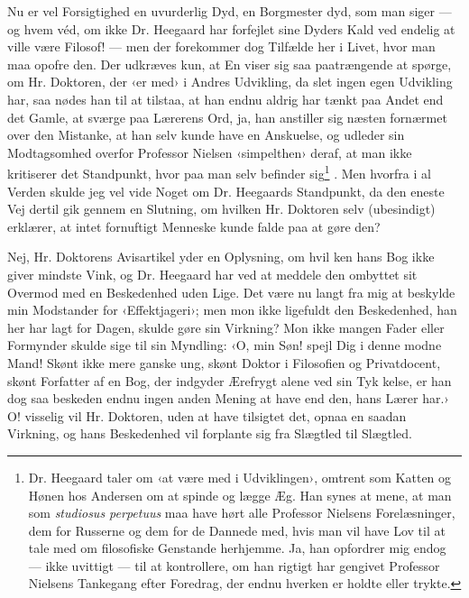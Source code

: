 \documentclass[12pt,a4paper,openany]{book}
\renewcommand{\thefootnote}{*)}
\newcommand{\fnmark}[2]{\renewcommand{\thefootnote}{#1}\footnote{#2}%
  \renewcommand{\thefootnote}{*)}}
\newcommand{\opage}[1]{\marginnote{\footnotesize\textit{[#1]}}}
\begin{document}
Nu er vel Forsigtighed en uvurderlig Dyd, en Borgmester\-%
dyd, som man siger --- og hvem véd, om ikke Dr. Heegaard
har forfejlet sine Dyders Kald ved endelig at ville være
Filosof! --- men der forekommer dog Tilfælde her i Livet, hvor
man maa opofre den. Der udkræves kun, at En viser sig
saa paatrængende at spørge, om Hr. Doktoren, der ‹er med› i
Andres Udvikling, da slet ingen egen Udvikling har, saa nødes
han til at tilstaa, at han endnu aldrig har tænkt paa Andet end
det Gamle, at sværge paa Lærerens Ord, ja, han anstiller sig
næsten fornærmet over den Mistanke, at han selv kunde have en
Anskuelse, og udleder sin Modtagsomhed overfor Professor Nielsen
\opage{36}‹simpelthen› deraf, at man ikke kritiserer det Standpunkt, hvor\-%
paa man selv befinder sig\fnmark{*)}{Dr. Heegaard taler om ‹at være med i Udviklingen›, omtrent som
Katten og Hønen hos Andersen om at spinde og lægge Æg. Han synes
at mene, at man som \emph{studiosus perpetuus} maa have hørt alle Professor
Nielsens Forelæsninger, dem for Russerne og dem for de Dannede med,
hvis man vil have Lov til at tale med om filosofiske Genstande herhjemme.
Ja, han opfordrer mig endog --- ikke uvittigt --- til at kontrollere, om han
rigtigt har gengivet Professor Nielsens Tankegang efter Foredrag, der endnu
hverken er holdte eller trykte.}. Men hvorfra i al Verden skulde jeg
vel vide Noget om Dr. Heegaards Standpunkt, da den eneste
Vej dertil gik gennem en Slutning, om hvilken Hr. Doktoren selv
(ubesindigt) erklærer, at intet fornuftigt Menneske kunde falde
paa at gøre den?

Nej, Hr. Doktorens Avisartikel yder en Oplysning, om hvil\-%
ken hans Bog ikke giver mindste Vink, og Dr. Heegaard har ved
at meddele den ombyttet sit Overmod med en Beskedenhed uden
Lige. Det være nu langt fra mig at beskylde min Modstander
for ‹Effektjageri›; men mon ikke ligefuldt den Beskedenhed, han
her har lagt for Dagen, skulde gøre sin Virkning? Mon ikke
mangen Fader eller Formynder skulde sige til sin Myndling:
‹O, min Søn! spejl Dig i denne modne Mand! Skønt ikke mere
ganske ung, skønt Doktor i Filosofien og Privatdocent, skønt
Forfatter af en Bog, der indgyder Ærefrygt alene ved sin Tyk\-%
kelse, er han dog saa beskeden endnu ingen anden Mening at
have end den, hans Lærer har.› O! visselig vil Hr. Doktoren,
uden at have tilsigtet det, opnaa en saadan Virkning, og hans
Beskedenhed vil forplante sig fra Slægtled til Slægtled.
\end{document}
